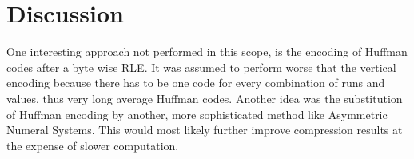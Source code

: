 
\chapter{Discussion}
\label{ch:Discussion}

\par{
	One interesting approach not performed in this scope, is the encoding of Huffman codes after a byte wise RLE. It was assumed to perform worse that the vertical encoding because there has to be one code for every combination of runs and values, thus very long average Huffman codes. Another idea was the substitution of Huffman encoding by another, more sophisticated method like Asymmetric Numeral Systems. This would most likely further improve compression results at the expense of slower computation.
}
